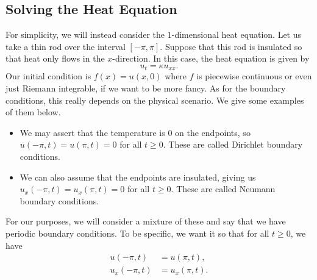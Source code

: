 \subsection{Solving the Heat Equation}
For simplicity, we will instead consider the $1$-dimensional heat equation. 
Let us take a thin rod over the interval $[-\pi, \pi]$. Suppose that this 
rod is insulated so that heat only flows in the $x$-direction. In this 
case, the heat equation is given by 
\[ u_t = \kappa u_{xx}. \] 
Our initial condition is $f(x) = u(x, 0)$ where $f$ is piecewise continuous
or even just Riemann integrable, if we want to be more fancy. As for the 
boundary conditions, this really depends on the physical scenario. We give 
some examples of them below.
\begin{itemize}
    \item We may assert that the temperature is $0$ on the endpoints, so
    $u(-\pi, t) = u(\pi, t) = 0$ for all $t \geq 0$. These are called 
    Dirichlet boundary conditions.
    \item We can also assume that the endpoints are insulated, giving us 
    $u_x(-\pi, t) = u_x(\pi, t) = 0$ for all $t \geq 0$. These are called 
    Neumann boundary conditions.
\end{itemize}
For our purposes, we will consider a mixture of these and say that we have 
periodic boundary conditions. To be specific, we want it so that for all 
$t \geq 0$, we have 
\begin{align*}
    u(-\pi, t) &= u(\pi, t), \\ 
    u_x(-\pi, t) &= u_x(\pi, t).
\end{align*}
